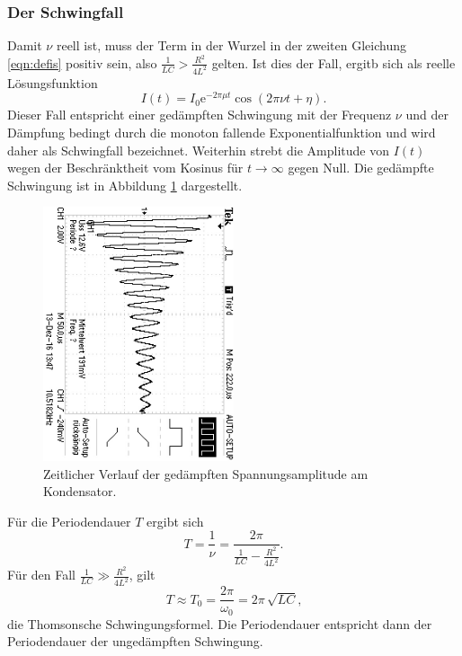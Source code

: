 \subsubsection{Der Schwingfall}
Damit $\nu$ reell ist, muss der Term in der Wurzel in der zweiten Gleichung \eqref{eqn:defis}
positiv sein, also $\frac{1}{LC} > \frac{R^2}{4L^2}$ gelten.
Ist dies der Fall, ergitb sich als reelle Lösungsfunktion
\begin{equation}
	I(t) = I_0 \mathrm{e}^{-2 \pi \mu t} \cos(2\pi \nu t + \eta) \text{.}
	\label{eqn:schwingi}
\end{equation}
Dieser Fall entspricht einer gedämpften Schwingung mit der Frequenz $\nu$ und der Dämpfung
bedingt durch die monoton fallende Exponentialfunktion und wird daher als Schwingfall bezeichnet.
Weiterhin strebt die Amplitude von $I(t)$ wegen der Beschränktheit vom Kosinus für $t \to \infty$ gegen Null.
Die gedämpfte Schwingung ist in Abbildung \ref{fig:???} dargestellt.
\begin{figure}
	\centering
	\includegraphics[width=0.5\textwidth,angle=90]{Bilder/a)correct/F0002TEK.JPG}
	\caption{Zeitlicher Verlauf der gedämpften Spannungsamplitude am Kondensator.}
	\label{fig:???}
\end{figure}
Für die Periodendauer $T$ ergibt sich
\begin{equation}
	T = \frac{1}{\nu} = \frac{2 \pi}{\frac{1}{LC} - \frac{R^2}{4L^2}} \text{.}
\end{equation}
Für den Fall $\frac{1}{LC} \gg \frac{R^2}{4L^2}$, gilt
\begin{equation}
	T \approx T_0 = \frac{2 \pi}{\omega_0} = 2 \pi \, \sqrt{LC} \text{,}
\end{equation}
die Thomsonsche Schwingungsformel. Die Periodendauer entspricht dann der Periodendauer der
ungedämpften Schwingung.

